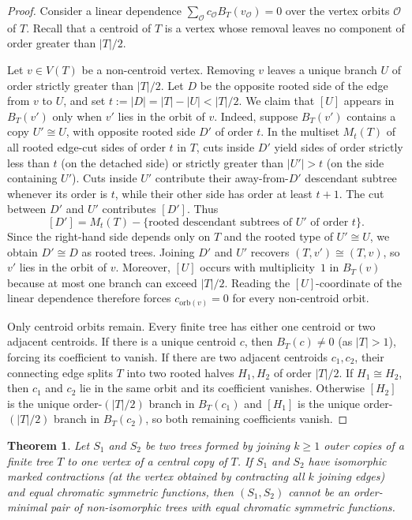 \documentclass[10pt]{article}
\newtheorem{theorem}{Theorem}[section]
\begin{document}
\begin{proof}
Consider a linear dependence $\sum_{\mathcal{O}} c_{\mathcal{O}} B_T(v_{\mathcal{O}}) = 0$ over the vertex orbits $\mathcal{O}$ of $T$. Recall that a centroid of $T$ is a vertex whose removal leaves no component of order greater than $|T|/2$.

Let $v\in V(T)$ be a non-centroid vertex. Removing $v$ leaves a unique branch $U$ of order strictly greater than $|T|/2$. Let $D$ be the opposite rooted side of the edge from $v$ to $U$, and set $t := |D| = |T|-|U| < |T|/2$. We claim that $[U]$ appears in $B_T(v')$ only when $v'$ lies in the orbit of $v$. Indeed, suppose $B_T(v')$ contains a copy $U'\cong U$, with opposite rooted side $D'$ of order $t$. In the multiset $M_t(T)$ of all rooted edge-cut sides of order $t$ in $T$, cuts inside $D'$ yield sides of order strictly less than $t$ (on the detached side) or strictly greater than $|U'|>t$ (on the side containing $U'$). Cuts inside $U'$ contribute their away-from-$D'$ descendant subtree whenever its order is $t$, while their other side has order at least $t+1$. The cut between $D'$ and $U'$ contributes $[D']$. Thus
\[
[D'] = M_t(T) - \{\text{rooted descendant subtrees of } U' \text{ of order } t\}.
\]
Since the right-hand side depends only on $T$ and the rooted type of $U'\cong U$, we obtain $D'\cong D$ as rooted trees. Joining $D'$ and $U'$ recovers $(T,v')\cong (T,v)$, so $v'$ lies in the orbit of $v$. Moreover, $[U]$ occurs with multiplicity~$1$ in $B_T(v)$ because at most one branch can exceed $|T|/2$. Reading the $[U]$-coordinate of the linear dependence therefore forces $c_{\mathrm{orb}(v)}=0$ for every non-centroid orbit.

Only centroid orbits remain. Every finite tree has either one centroid or two adjacent centroids. If there is a unique centroid $c$, then $B_T(c)\neq 0$ (as $|T|>1$), forcing its coefficient to vanish. If there are two adjacent centroids $c_1,c_2$, their connecting edge splits $T$ into two rooted halves $H_1,H_2$ of order $|T|/2$. If $H_1\cong H_2$, then $c_1$ and $c_2$ lie in the same orbit and its coefficient vanishes. Otherwise $[H_2]$ is the unique order-$(|T|/2)$ branch in $B_T(c_1)$ and $[H_1]$ is the unique order-$(|T|/2)$ branch in $B_T(c_2)$, so both remaining coefficients vanish.
\end{proof}

\begin{theorem}\label{thm:common-hub}
Let $S_1$ and $S_2$ be two trees formed by joining $k\ge 1$ outer copies of a finite tree $T$ to one vertex of a central copy of $T$. If $S_1$ and $S_2$ have isomorphic marked contractions (at the vertex obtained by contracting all $k$ joining edges) and equal chromatic symmetric functions, then $(S_1,S_2)$ cannot be an order-minimal pair of non-isomorphic trees with equal chromatic symmetric functions.
\end{theorem}
\end{document}
